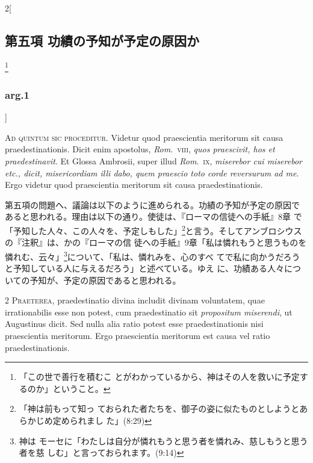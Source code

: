 \documentclass[paper=a4paper,fontsize=10pt,jafontsize=9pt,titlepage]{jlreq}
\begin{document}


\begin{paracol}{2}[\subsection{第五項 功績の予知が予定の原因か}\footnote{「この世で善行を積むこ とがわかっているから、神はその人を救いに予定するのか」ということ。}\subsubsection{arg.1}]

{\Huge A}{\scshape d quintum sic proceditur}. Videtur quod
praescientia meritorum sit causa praedestinationis. Dicit enim
apostolus, {\itshape Rom}.~{\scshape viii}, {\itshape quos praescivit, hos et praedestinavit}. Et Glossa
Ambrosii, super illud {\itshape Rom}.~{\scshape ix}, {\itshape miserebor cui miserebor etc., dicit,
misericordiam illi dabo, quem praescio toto corde reversurum ad me}. Ergo
videtur quod praescientia meritorum sit causa praedestinationis.


\switchcolumn


第五項の問題へ、議論は以下のように進められる。功績の予知が予定の原因で
あると思われる。理由は以下の通り。使徒は、『ローマの信徒への手紙』8章
で「予知した人々、この人々を、予定しもした」\footnote{「神は前もって知っ
ておられた者たちを、御子の姿に似たものとしようとあらかじめ定められまし
た」(8:29)}と言う。そしてアンブロシウスの『注釈』は、かの『ローマの信
徒への手紙』9章「私は憐れもうと思うものを憐れむ、云々」\footnote{神は
モーセに「わたしは自分が憐れもうと思う者を憐れみ、慈しもうと思う者を慈
しむ」と言っておられます。(9:14)}について、「私は、憐れみを、心のすべ
てで私に向かうだろうと予知している人に与えるだろう」と述べている。ゆえ
に、功績ある人々についての予知が、予定の原因であると思われる。




{\scshape 2 Praeterea}, praedestinatio divina includit
divinam voluntatem, quae irrationabilis esse non potest, cum
praedestinatio sit {\itshape propositum miserendi}, ut Augustinus dicit. Sed nulla
alia ratio potest esse praedestinationis nisi praescientia
meritorum. Ergo praescientia meritorum est causa vel ratio
praedestinationis.


\switchcolumn



\end{paracol}
\end{document}
